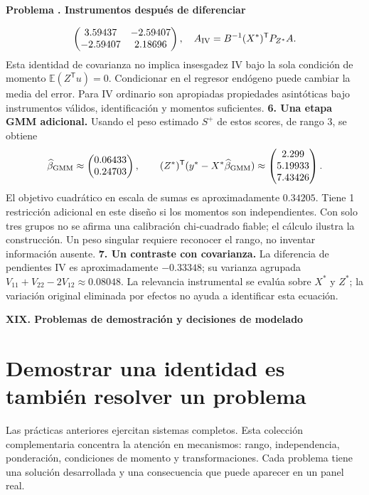 \documentclass[11pt,a4paper]{article}
\newcommand{\E}{\mathbb E}
\newcommand{\T}{^{\mathsf T}}
\theoremstyle{definition}
\newcommand{\parte}[1]{\par\bigskip\Needspace{8\baselineskip}\begin{center}{\Large\bfseries\color{azul}#1}\end{center}}
\newcounter{problema}
\newenvironment{resuelto}[1]{\refstepcounter{problema}\par\medskip\Needspace{6\baselineskip}\textbf{Problema \theproblema. #1}\par}{\par\medskip}
\begin{document}
\begin{resuelto}{Instrumentos después de diferenciar}
\[\begin{pmatrix}
3.59437&-2.59407\\-2.59407&2.18696
\end{pmatrix},\quad A_{\rm IV}=B^{-1}(X^*)\T P_{Z^*}A.
\]
Esta identidad de covarianza no implica insesgadez IV bajo la sola condición de momento $\E(Z\T u)=0$. Condicionar en el regresor endógeno puede cambiar la media del error. Para IV ordinario son apropiadas propiedades asintóticas bajo instrumentos válidos, identificación y momentos suficientes.
\textbf{6. Una etapa GMM adicional.} Usando el peso estimado $S^+$ de estos scores, de rango $3$, se obtiene
\[
\widehat\beta_{\rm GMM}\approx\begin{pmatrix}
0.06433\\0.24703
\end{pmatrix},\qquad
(Z^*)\T(y^*-X^*\widehat\beta_{\rm GMM})\approx\begin{pmatrix}
2.299\\5.19933\\7.43426
\end{pmatrix}.
\]
El objetivo cuadrático en escala de sumas es aproximadamente $0.34205$. Tiene 1 restricción adicional en este diseño si los momentos son independientes. Con solo tres grupos no se afirma una calibración chi-cuadrado fiable; el cálculo ilustra la construcción. Un peso singular requiere reconocer el rango, no inventar información ausente.
\textbf{7. Un contraste con covarianza.} La diferencia de pendientes IV es aproximadamente $-0.33348$; su varianza agrupada $V_{11}+V_{22}-2V_{12}\approx0.08048$. La relevancia instrumental se evalúa sobre $X^*$ y $Z^*$; la variación original eliminada por efectos no ayuda a identificar esta ecuación.
\end{resuelto}


\parte{XIX. Problemas de demostración y decisiones de modelado}
\section{Demostrar una identidad es también resolver un problema}
Las prácticas anteriores ejercitan sistemas completos. Esta colección complementaria concentra la atención en mecanismos: rango, independencia, ponderación, condiciones de momento y transformaciones. Cada problema tiene una solución desarrollada y una consecuencia que puede aparecer en un panel real.
\end{document}
